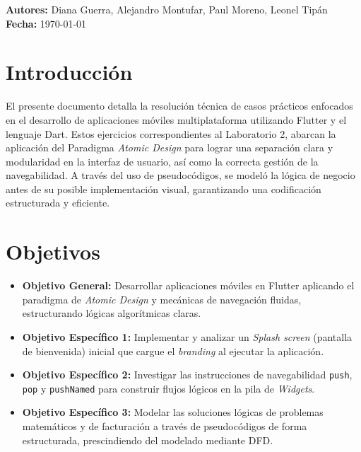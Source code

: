 \documentclass[12pt, a4paper]{article}
\begin{document}
\begin{titlepage}
\vfill
\begin{tcolorbox}[
    enhanced,
    width=\linewidth,
    colback=black!3,
    colframe=black!20,
    boxrule=0.5pt,
    arc=4pt,
    left=12pt,
    right=12pt,
    top=10pt,
    bottom=10pt
]
\color{black}
\textbf{Autores:} Diana Guerra, Alejandro Montufar, Paul Moreno, Leonel Tipán\\[4pt]
\textbf{Fecha:} \today
\end{tcolorbox}
\end{titlepage}

\tableofcontents
\newpage

\section{Introducción}
El presente documento detalla la resolución técnica de casos prácticos enfocados en el desarrollo de aplicaciones móviles multiplataforma utilizando Flutter y el lenguaje Dart. Estos ejercicios correspondientes al Laboratorio 2, abarcan la aplicación del Paradigma \textit{Atomic Design} para lograr una separación clara y modularidad en la interfaz de usuario, así como la correcta gestión de la navegabilidad. A través del uso de pseudocódigos, se modeló la lógica de negocio antes de su posible implementación visual, garantizando una codificación estructurada y eficiente.

\section{Objetivos}
\begin{itemize}
    \item \textbf{Objetivo General:} Desarrollar aplicaciones móviles en Flutter aplicando el paradigma de \textit{Atomic Design} y mecánicas de navegación fluidas, estructurando lógicas algorítmicas claras.
    \item \textbf{Objetivo Específico 1:} Implementar y analizar un \textit{Splash screen} (pantalla de bienvenida) inicial que cargue el \textit{branding} al ejecutar la aplicación.
    \item \textbf{Objetivo Específico 2:} Investigar las instrucciones de navegabilidad \texttt{push}, \texttt{pop} y \texttt{pushNamed} para construir flujos lógicos en la pila de \textit{Widgets}.
    \item \textbf{Objetivo Específico 3:} Modelar las soluciones lógicas de problemas matemáticos y de facturación a través de pseudocódigos de forma estructurada, prescindiendo del modelado mediante DFD.
\end{itemize}
\end{document}
